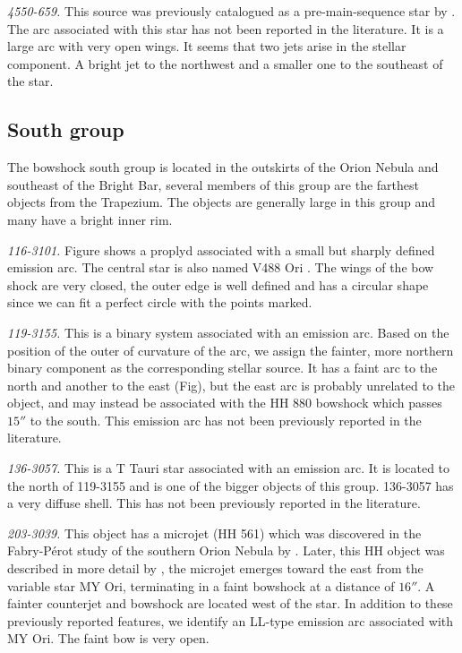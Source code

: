 \documentclass[apj, twocolumn]{aastex63}
\renewcommand\clearpage{}
\begin{document}
\textit{4550-659.} This source was previously catalogued as a pre-main-sequence
star by \citet{Parihar:2009}. The arc associated with this star has not been
reported in the literature. It is a large arc with very open wings. It seems
that two jets arise in the stellar component. A bright jet to the northwest
and a smaller one to the southeast of the star.  


\clearpage
\subsection{South group}
\label{sec:s-group}



The bowshock south group is located in the outskirts of the Orion
Nebula and southeast of the Bright Bar, several members of this
group are the farthest objects from the Trapezium. The objects
are generally large in this group and many have a bright inner rim.   
 

\textit{116-3101.} Figure shows a proplyd associated with a small
but sharply defined emission arc.  The central star is also
named V488 Ori \citep{Bally:2006a}. The wings of the bow shock
are very closed, the outer edge is well defined and has a circular
shape since we can fit a perfect circle with the points marked.  

\textit{119-3155.} This is a binary system associated with an
emission arc. Based on the position of the outer of curvature of
the arc, we assign the fainter, more northern binary component as
the corresponding stellar source. It has a faint arc to the north
and another to the east (Fig), but  the east arc is probably
unrelated to the object, and may instead be associated with the
HH 880 bowshock which passes \(15''\) to the south. This emission
arc has not been previously reported in the literature.     

\textit{136-3057.} This is a T Tauri star associated with an
emission arc. It is located to the north of 119-3155 and is
one of the bigger objects of this group. 136-3057 has a very
diffuse shell. This has not been previously reported in the
literature.


\textit{203-3039.} This object has a microjet (HH 561) which was
discovered in the Fabry-Pérot study of the southern Orion Nebula
by \citet{Bally:2001a}. Later, this HH object was described in
more detail by \citet{Bally:2006a}, the microjet emerges toward
the east from the variable star MY Ori, terminating in a faint
bowshock at a distance of \(16''\). A fainter counterjet and
bowshock are located west of the star. In addition to these
previously reported features, we identify an LL-type emission arc
associated with MY Ori. The faint bow is very open.
\end{document}
